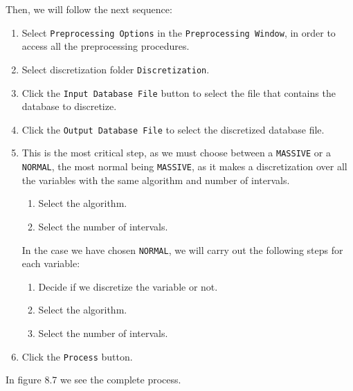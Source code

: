 Then, we will follow the next sequence:
\begin{enumerate}
	\item	Select \verb=Preprocessing Options= in the \verb=Preprocessing Window=, in order to
			access all the preprocessing procedures.
	\item	Select discretization folder \verb=Discretization=.
	\item	Click the \verb=Input Database File= button to select the file that contains the database
			to discretize.
	\item	Click the \verb=Output Database File= to select the discretized database file.
	\item	This is the most critical step, as we must choose between a \verb=MASSIVE=
			or a \verb=NORMAL=, the most normal being \verb=MASSIVE=, as it makes a discretization
			over all the variables with the same algorithm and number of intervals.
			\begin{enumerate}
				\item	Select the algorithm.
				\item	Select the number of intervals.
			\end{enumerate}
			In the case we have chosen \verb=NORMAL=, we will carry out the following steps for each variable:
			\begin{enumerate}
				\item	Decide if we discretize the variable or not.
				\item	Select the algorithm.
				\item	Select the number of intervals.
			\end{enumerate}
	\item	Click the \verb=Process= button.
\end{enumerate}

In figure 8.7 we see the complete process.

